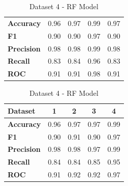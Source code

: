 \begin{table}[H]
\begin{subtable}[H]{0.45\textwidth}
\begin{tabular}{|l|c|c|c|c|}
            \hline
            \textbf{Accuracy} & 0.96 & 0.97 & 0.99 & 0.97 \\
            \textbf{F1} & 0.90 & 0.90 & 0.97 & 0.90 \\
            \textbf{Precision} & 0.98 & 0.98 & 0.99 & 0.98 \\
            \textbf{Recall} & 0.83 & 0.84 & 0.96 & 0.83 \\
            \textbf{ROC} & 0.91 & 0.91 & 0.98 & 0.91 \\
            \hline
        \end{tabular}
        \caption{Dataset 3 - RF Model}\label{subtab:dataset_3_rf_model}
    \end{subtable}
    \quad
    \begin{subtable}[H]{0.45\textwidth}
        \centering
        \begin{tabular}{|l|c|c|c|c|}
            \hline
            \textbf{Dataset} & \textbf{1} & \textbf{2} & \textbf{3} & \textbf{4} \\
            \hline
            \textbf{Accuracy} & 0.96 & 0.97 & 0.97 & 0.99 \\
            \textbf{F1} & 0.90 & 0.91 & 0.90 & 0.97 \\
            \textbf{Precision} & 0.98 & 0.98 & 0.97 & 0.99 \\
            \textbf{Recall} & 0.84 & 0.84 & 0.85 & 0.95 \\
            \textbf{ROC} & 0.91 & 0.92 & 0.92 & 0.97 \\
            \hline
        \end{tabular}
        \caption{Dataset 4 - RF Model}\label{subtab:dataset_4_rf_model}
    \end{subtable}
\end{table}


